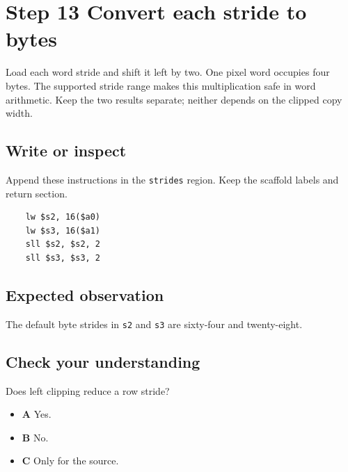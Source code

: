 \section{Step 13 Convert each stride to bytes}\label{blit-s13}

Load each word stride and shift it left by two. One pixel word occupies four bytes. The supported stride range makes this multiplication safe in word arithmetic. Keep the two results separate; neither depends on the clipped copy width.

\subsection{Write or inspect}
Append these instructions in the \texttt{strides} region. Keep the scaffold labels and return section.

\begin{verbatim}
    lw $s2, 16($a0)
    lw $s3, 16($a1)
    sll $s2, $s2, 2
    sll $s3, $s3, 2
\end{verbatim}

\subsection{Expected observation}
The default byte strides in \texttt{s2} and \texttt{s3} are sixty-four and twenty-eight.

\subsection{Check your understanding}
Does left clipping reduce a row stride?

\begin{itemize}
  \item \textbf{A} Yes.
  \item \textbf{B} No.
  \item \textbf{C} Only for the source.
\end{itemize}
